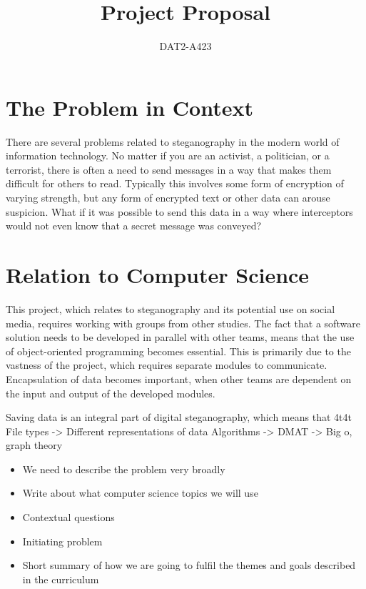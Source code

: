 \documentclass[a4paper,12pt,hidelinks]{article}
\newcommand{\group}{DAT2-A423}
\begin{document}
	\title{Project Proposal}
	\author{\group}
	\maketitle
	
	\section{The Problem in Context}
There are several problems related to steganography in the modern world of information technology. No matter if you are an activist, a politician, or a terrorist, there is often a need to send messages in a way that makes them difficult for others to read. Typically this involves some form of encryption of varying strength, but any form of encrypted text or other data can arouse suspicion. What if it was possible to send this data in a way where interceptors would not even know that a secret message was conveyed? 

	\section{Relation to Computer Science}
This project, which relates to steganography and its potential use on social media, requires working with groups from other studies. The fact that a software solution needs to be developed in parallel with other teams, means that the use of object-oriented programming becomes essential. This is primarily due to the vastness of the project, which requires separate modules to communicate. Encapsulation of data becomes important, when other teams are dependent on the input and output of the developed modules.
	
Saving data is an integral part of digital steganography, which means that
4t4t
File types -> Different representations of data
Algorithms ->
DMAT -> Big o, graph theory


\begin{itemize}
	\item We need to describe the problem very broadly
	\item Write about what computer science topics we will use
	\item Contextual questions
	\item Initiating problem 
	\item Short summary of how we are going to fulfil the themes and goals described in the curriculum
\end{itemize}
\end{document}
